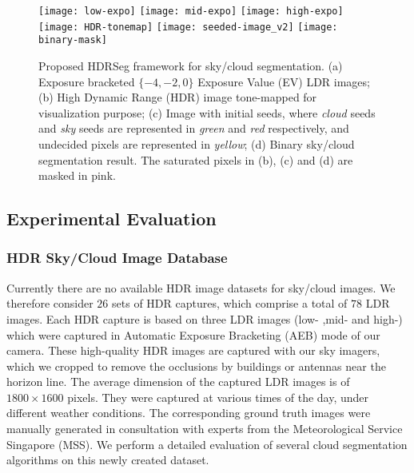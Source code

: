 \begin{figure}[htb]
\centering
\texttt{[image: low-expo]}\hspace{0.5mm}    
\texttt{[image: mid-expo]}\hspace{0.5mm} 
\texttt{[image: high-expo]}\hspace{0.5mm}
\texttt{[image: HDR-tonemap]}\hspace{0.5mm}
\texttt{[image: seeded-image\_v2]}\hspace{0.5mm}
\texttt{[image: binary-mask]}\hspace{0.5mm}\\
\caption[Illustrating explaining the proposed HDRSeg framework.]{Proposed HDRSeg framework for sky/cloud segmentation. (a) Exposure bracketed $\{-4,-2,0\}$ Exposure Value (EV) LDR images; (b) High Dynamic Range (HDR) image tone-mapped for visualization purpose; (c) Image with initial seeds, where \emph{cloud} seeds and \emph{sky} seeds are represented in \emph{green} and \emph{red} respectively, and undecided pixels are represented in \emph{yellow}; (d) Binary sky/cloud segmentation result. The saturated pixels in (b), (c) and (d) are masked in pink.}
\label{fig:HDRcut}
\end{figure}



\subsection{Experimental Evaluation}

\subsubsection{HDR Sky/Cloud Image Database}
Currently there are no available HDR image datasets for sky/cloud images. We therefore consider $26$ sets of HDR captures, which comprise a total of $78$ LDR images. Each HDR capture is based on three LDR images (low- ,mid- and high-) which were captured in Automatic Exposure Bracketing (AEB) mode of our camera. These high-quality HDR images are captured with our sky imagers, which we cropped to remove the occlusions by buildings or antennas near the horizon line. The average dimension of the captured LDR images is of $1800 \times 1600$ pixels. They were captured at various times of the day, under different weather conditions. The corresponding ground truth images were manually generated in consultation with experts from the Meteorological Service Singapore (MSS). We perform a detailed evaluation of several cloud segmentation algorithms on this newly created dataset. 

